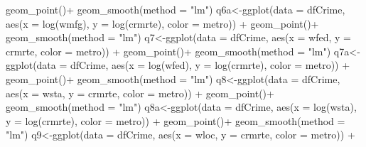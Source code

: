 \documentclass[]{article}
\newenvironment{Shaded}{}{}
\newcommand{\DataTypeTok}[1]{#1}
\newcommand{\KeywordTok}[1]{\textcolor[rgb]{0.00,0.00,1.00}{#1}}
\newcommand{\NormalTok}[1]{#1}
\newcommand{\OperatorTok}[1]{#1}
\newcommand{\StringTok}[1]{\textcolor[rgb]{0.00,0.50,0.50}{#1}}
\begin{document}
\begin{Shaded}
\begin{Highlighting}[]
\StringTok{      }\KeywordTok{geom_point}\NormalTok{()}\OperatorTok{+}
\StringTok{  }\KeywordTok{geom_smooth}\NormalTok{(}\DataTypeTok{method =} \StringTok{"lm"}\NormalTok{)}
\NormalTok{q6a<-}\KeywordTok{ggplot}\NormalTok{(}\DataTypeTok{data =}\NormalTok{ dfCrime, }\KeywordTok{aes}\NormalTok{(}\DataTypeTok{x =} \KeywordTok{log}\NormalTok{(wmfg), }\DataTypeTok{y =} \KeywordTok{log}\NormalTok{(crmrte), }\DataTypeTok{color =}\NormalTok{ metro)) }\OperatorTok{+}
\StringTok{      }\KeywordTok{geom_point}\NormalTok{()}\OperatorTok{+}
\StringTok{  }\KeywordTok{geom_smooth}\NormalTok{(}\DataTypeTok{method =} \StringTok{"lm"}\NormalTok{)}
\NormalTok{q7<-}\KeywordTok{ggplot}\NormalTok{(}\DataTypeTok{data =}\NormalTok{ dfCrime, }\KeywordTok{aes}\NormalTok{(}\DataTypeTok{x =}\NormalTok{ wfed, }\DataTypeTok{y =}\NormalTok{ crmrte, }\DataTypeTok{color =}\NormalTok{ metro)) }\OperatorTok{+}
\StringTok{      }\KeywordTok{geom_point}\NormalTok{()}\OperatorTok{+}
\StringTok{  }\KeywordTok{geom_smooth}\NormalTok{(}\DataTypeTok{method =} \StringTok{"lm"}\NormalTok{)}
\NormalTok{q7a<-}\KeywordTok{ggplot}\NormalTok{(}\DataTypeTok{data =}\NormalTok{ dfCrime, }\KeywordTok{aes}\NormalTok{(}\DataTypeTok{x =} \KeywordTok{log}\NormalTok{(wfed), }\DataTypeTok{y =} \KeywordTok{log}\NormalTok{(crmrte), }\DataTypeTok{color =}\NormalTok{ metro)) }\OperatorTok{+}
\StringTok{      }\KeywordTok{geom_point}\NormalTok{()}\OperatorTok{+}
\StringTok{  }\KeywordTok{geom_smooth}\NormalTok{(}\DataTypeTok{method =} \StringTok{"lm"}\NormalTok{)}
\NormalTok{q8<-}\KeywordTok{ggplot}\NormalTok{(}\DataTypeTok{data =}\NormalTok{ dfCrime, }\KeywordTok{aes}\NormalTok{(}\DataTypeTok{x =}\NormalTok{ wsta, }\DataTypeTok{y =}\NormalTok{ crmrte, }\DataTypeTok{color =}\NormalTok{ metro)) }\OperatorTok{+}
\StringTok{      }\KeywordTok{geom_point}\NormalTok{()}\OperatorTok{+}
\StringTok{  }\KeywordTok{geom_smooth}\NormalTok{(}\DataTypeTok{method =} \StringTok{"lm"}\NormalTok{)}
\NormalTok{q8a<-}\KeywordTok{ggplot}\NormalTok{(}\DataTypeTok{data =}\NormalTok{ dfCrime, }\KeywordTok{aes}\NormalTok{(}\DataTypeTok{x =} \KeywordTok{log}\NormalTok{(wsta), }\DataTypeTok{y =} \KeywordTok{log}\NormalTok{(crmrte), }\DataTypeTok{color =}\NormalTok{ metro)) }\OperatorTok{+}
\StringTok{      }\KeywordTok{geom_point}\NormalTok{()}\OperatorTok{+}
\StringTok{  }\KeywordTok{geom_smooth}\NormalTok{(}\DataTypeTok{method =} \StringTok{"lm"}\NormalTok{)}
\NormalTok{q9<-}\KeywordTok{ggplot}\NormalTok{(}\DataTypeTok{data =}\NormalTok{ dfCrime, }\KeywordTok{aes}\NormalTok{(}\DataTypeTok{x =}\NormalTok{ wloc, }\DataTypeTok{y =}\NormalTok{ crmrte, }\DataTypeTok{color =}\NormalTok{ metro)) }\OperatorTok{+}

\end{Highlighting}
\end{Shaded}
\end{document}
